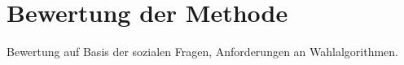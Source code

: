 \section{Bewertung der Methode}
\label{sec:bewertung1}

Bewertung auf Basis der sozialen Fragen, Anforderungen an Wahlalgorithmen.


